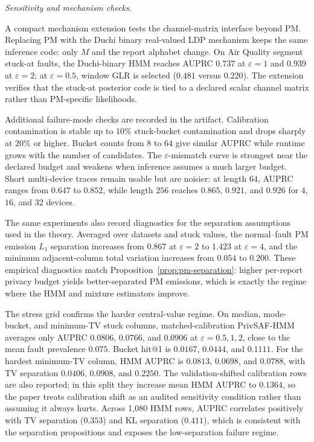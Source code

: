\documentclass[conference]{IEEEtran}
\begin{document}
\noindent\emph{Sensitivity and mechanism checks.}
\label{ssec:stress_diagnostics}

A compact mechanism extension tests the channel-matrix interface beyond PM. Replacing PM with the Duchi binary real-valued LDP mechanism keeps the same inference code: only \(M\) and the report alphabet change. On Air Quality segment stuck-at faults, the Duchi-binary HMM reaches AUPRC \(0.737\) at \(\varepsilon=1\) and \(0.939\) at \(\varepsilon=2\); at \(\varepsilon=0.5\), window GLR is selected (\(0.481\) versus \(0.220\)). The extension verifies that the stuck-at posterior code is tied to a declared scalar channel matrix rather than PM-specific likelihoods.

Additional failure-mode checks are recorded in the artifact. Calibration contamination is stable up to \(10\%\) stuck-bucket contamination and drops sharply at \(20\%\) or higher. Bucket counts from \(8\) to \(64\) give similar AUPRC while runtime grows with the number of candidates. The \(\varepsilon\)-mismatch curve is strongest near the declared budget and weakens when inference assumes a much larger budget. Short multi-device traces remain usable but are noisier: at length \(64\), AUPRC ranges from \(0.647\) to \(0.852\), while length \(256\) reaches \(0.865\), \(0.921\), and \(0.926\) for \(4\), \(16\), and \(32\) devices.

The same experiments also record diagnostics for the separation assumptions used in the theory. Averaged over datasets and stuck values, the normal--fault PM emission \(L_1\) separation increases from \(0.867\) at \(\varepsilon=2\) to \(1.423\) at \(\varepsilon=4\), and the minimum adjacent-column total variation increases from \(0.054\) to \(0.200\). These empirical diagnostics match Proposition~\ref{prop:pm-separation}: higher per-report privacy budget yields better-separated PM emissions, which is exactly the regime where the HMM and mixture estimators improve.

The stress grid confirms the harder central-value regime. On median, mode-bucket, and minimum-TV stuck columns, matched-calibration PrivSAF-HMM averages only AUPRC \(0.0806\), \(0.0766\), and \(0.0906\) at \(\varepsilon=0.5,1,2\), close to the mean fault prevalence \(0.075\). Bucket hit@1 is \(0.0167\), \(0.0444\), and \(0.1111\). For the hardest minimum-TV column, HMM AUPRC is \(0.0813\), \(0.0698\), and \(0.0788\), with TV separation \(0.0406\), \(0.0908\), and \(0.2250\). The validation-shifted calibration rows are also reported; in this split they increase mean HMM AUPRC to \(0.1364\), so the paper treats calibration shift as an audited sensitivity condition rather than assuming it always hurts. Across 1,080 HMM rows, AUPRC correlates positively with TV separation (\(0.353\)) and KL separation (\(0.411\)), which is consistent with the separation propositions and exposes the low-separation failure regime.
\end{document}
